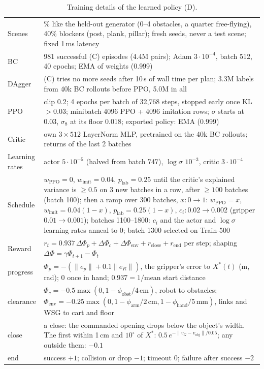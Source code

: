 \documentclass[conference]{IEEEtran}
\begin{document}
\begin{table}[!t]
  \centering
  \caption{Training details of the learned policy (D).}
  \label{tab:rl}
  \footnotesize
  \setlength{\tabcolsep}{3pt}
  \begin{tabular}{@{}>{\raggedright\arraybackslash}p{}>{\raggedright\arraybackslash}p{}@{}}
    \toprule
    Scenes & 60\% like the held-out generator (0--4 obstacles, a quarter free-flying), 40\% blockers (post, plank,
      pillar); fresh seeds, never a test scene; fixed 1\,ms latency \\
    BC & 34{,}981 successful (C) episodes (4.4M pairs); Adam $3\cdot10^{-4}$, batch 512, 40 epochs; EMA of weights
      (0.999) \\
    DAgger & (C) tries no more seeds after 10\,s of wall time per plan; 3.3M labels from 40k BC rollouts before PPO,
      5.0M in all \\
    PPO & clip 0.2; 4 epochs per batch of 32{,}768 steps, stopped early once KL $>0.03$; minibatch 4096 PPO + 4096
      imitation rows; $\sigma$ starts at 0.03, $\sigma_8$ at its floor 0.018; exported policy: EMA (0.999) \\
    Critic & own $3\times512$ LayerNorm MLP, pretrained on the 40k BC rollouts; returns of the last 2 batches \\
    Learning rates & actor $5\cdot10^{-5}$ (halved from batch 747), $\log\sigma$ $10^{-3}$, critic $3\cdot10^{-4}$ \\
    Schedule & $w_{\text{PPO}}=0$, $w_{\text{imit}}=0.04$, $p_{\text{lab}}=0.25$ until the critic's explained variance is
      $\ge0.5$ on 3 new batches in a row, after $\ge100$ batches (batch 100); then a ramp over 300 batches, $x:0\to1$:
      $w_{\text{PPO}}=x$, $w_{\text{imit}}=0.04(1-x)$, $p_{\text{lab}}=0.25(1-x)$, $c_i:0.02\to0.002$ (gripper
      $0.01\to0.001$); batches 1100--1800: $c_i$ and the actor and $\log\sigma$ learning rates anneal to 0; batch 1300
      selected on Train-500 \\
    \midrule
    Reward & $r_t=0.937\,\Delta\Phi_p+\Delta\Phi_c+\Delta\Phi_{\text{env}}+r_{\text{close}}+r_{\text{end}}$ per step;
      shaping $\Delta\Phi=\gamma\Phi_{t+1}-\Phi_t$ \\
    \quad progress & $\Phi_p=-(\lVert e_p\rVert+0.1\lVert e_R\rVert)$, the gripper's error to $X^*(t)$ (m, rad); 0
      once in hand; $0.937=1/$mean start distance \\
    \quad clearance & $\Phi_c=-0.5\max(0,1-\phi_{\text{obst}}/4\,\text{cm})$, robot to obstacles;
      $\Phi_{\text{env}}=-0.25\max(0,1-\phi_{\text{arm}}/2\,\text{cm},1-\phi_{\text{hand}}/5\,\text{mm})$, links and WSG
      to cart and floor \\
    \quad close & a close: the commanded opening drops below the object's width. The first within 1\,cm and
      $10^\circ$ of $X^*$: $0.5\,e^{-\lVert v_G-v_{\text{obj}}\rVert/0.05}$; any outside them: $-0.1$ \\
    \quad end & success $+1$; collision or drop $-1$; timeout 0; failure after success $-2$ \\
    \bottomrule
  \end{tabular}
\end{table}
\end{document}
